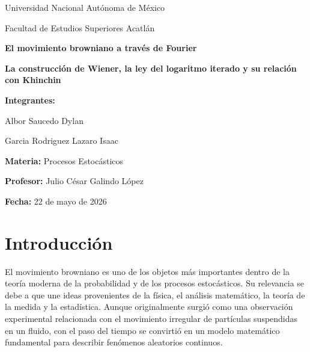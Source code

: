 \documentclass[12pt]{article}
\begin{document}
\begin{titlepage}
    \centering

    {\Large Universidad Nacional Autónoma de México\par}
    \vspace{0.5cm}
    {\Large Facultad de Estudios Superiores Acatlán\par}

    \vspace{2cm}

    {\Huge \textbf{El movimiento browniano a través de Fourier}\par}

    \vspace{0.5cm}

    {\Large \textbf{La construcción de Wiener, la ley del logaritmo iterado y su relación con Khinchin}\par}

    \vspace{2cm}

    {\Large \textbf{Integrantes:}\par}
    \vspace{0.3cm}
    {\Large Albor Saucedo Dylan\par}
    {\Large Garcia Rodriguez Lazaro Isaac\par}

    \vspace{0.7cm}

    {\Large \textbf{Materia:} Procesos Estocásticos\par}
    \vspace{0.5cm}

    {\Large \textbf{Profesor:} Julio César Galindo López\par}
    \vspace{0.5cm}

    {\Large \textbf{Fecha:} 22 de mayo de 2026\par}

    \vfill
\end{titlepage}

\tableofcontents
\newpage

\section{Introducción}

El movimiento browniano es uno de los objetos más importantes dentro de la teoría moderna de la probabilidad y de los procesos estocásticos. Su relevancia se debe a que une ideas provenientes de la física, el análisis matemático, la teoría de la medida y la estadística. Aunque originalmente surgió como una observación experimental relacionada con el movimiento irregular de partículas suspendidas en un fluido, con el paso del tiempo se convirtió en un modelo matemático fundamental para describir fenómenos aleatorios continuos.
\end{document}
